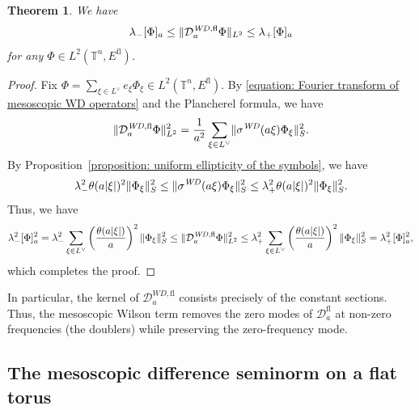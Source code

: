 \documentclass[a4paper,oneside,12pt]{amsart}
\theoremstyle{plain}
\newtheorem{theorem}{Theorem}[section]
\theoremstyle{definition}
\theoremstyle{remark}
\DeclarePairedDelimiter{\abs}{\lvert}{\rvert}
\DeclarePairedDelimiter{\norm}{\lVert}{\rVert}
\DeclarePairedDelimiter{\seminorm}{\lbrack}{\rbrack}
\newcommand{\flattorus}{\mathbb{T}^n}
\newcommand{\Lattice}{L}
\newcommand{\duallattice}[1]{#1^{\vee}}
\newcommand{\Ltwonorm}[2][L^2]{\norm{#2}_{#1}}
\newcommand{\mesoscopicseminorm}[2][a]{\seminorm{#2}_{#1}}
\newcommand{\mesoscopicDiracoperator}[1][a]{\mathcal{D}_{#1}}
\newcommand{\symbolWilsonDirac}{\sigma^{\mathit{WD}}}
\newcommand{\flatmesoscopicDiracoperator}{\mesoscopicDiracoperator^{\mathrm{fl}}}
\newcommand{\flatmesoscopicWilsonDiracoperator}[1][a]{\mathcal{D}_{#1}^{\mathit{WD},\mathrm{fl}}}
\newcommand{\flatmodel}[1]{#1^{\mathrm{fl}}}
\begin{document}
\begin{theorem}\label{theorem: estimate of WD by seminorm}
  We have
  \begin{equation}
    \lambda_- \mesoscopicseminorm{\Phi} \le \Ltwonorm{\flatmesoscopicWilsonDiracoperator \Phi} \le \lambda_+ \mesoscopicseminorm{\Phi}
  \end{equation}
  for any $\Phi \in L^2(\flattorus,\flatmodel{E})$.
\end{theorem}
\begin{proof}
  Fix $\Phi = \sum_{\xi \in \duallattice{\Lattice}} e_{\xi} \Phi_{\xi} \in  L^2(\flattorus,\flatmodel{E})$.
  By \eqref{equation: Fourier transform of mesoscopic WD operators} and the Plancherel formula, we have
  \begin{equation}
    \Ltwonorm{\flatmesoscopicWilsonDiracoperator \Phi}^2 = \frac{1}{a^2} \sum_{\xi \in \duallattice{\Lattice}} \norm{\symbolWilsonDirac(a\xi) \Phi_{\xi}}_S^2.
  \end{equation}
  By Proposition~\ref{proposition: uniform ellipticity of the symbols}, we have
  \begin{equation}
    \lambda_-^2 \theta(a\abs{\xi})^2 \norm{\Phi_{\xi}}_S^2 \le \norm{\symbolWilsonDirac(a\xi) \Phi_{\xi}}_S^2 \le \lambda_+^2 \theta(a\abs{\xi})^2 \norm{\Phi_{\xi}}_S^2.
  \end{equation}
  Thus, we have
  \begin{equation}
     \lambda_-^2 \mesoscopicseminorm{\Phi}^2 = \lambda_-^2 \sum_{\xi \in \duallattice{\Lattice}} \left(\frac{\theta(a\abs{\xi})}{a}\right)^2 \norm{\Phi_{\xi}}_S^2 \le \Ltwonorm{\flatmesoscopicWilsonDiracoperator \Phi}^2 \le \lambda_+^2 \sum_{\xi \in \duallattice{\Lattice}} \left(\frac{\theta(a\abs{\xi})}{a}\right)^2 \norm{\Phi_{\xi}}_S^2 = \lambda_+^2 \mesoscopicseminorm{\Phi}^2,
  \end{equation}
  which completes the proof.
\end{proof}

In particular, the kernel of $\flatmesoscopicWilsonDiracoperator$ consists precisely of the constant sections.
Thus, the mesoscopic Wilson term removes the zero modes of $\flatmesoscopicDiracoperator$ at non-zero frequencies (the doublers) while preserving the zero-frequency mode.

\subsection{The mesoscopic difference seminorm on a flat torus}
\end{document}
